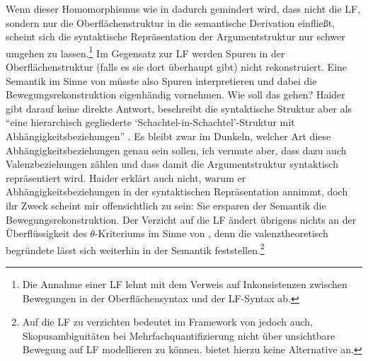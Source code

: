 {Wenn dieser Homomorphismus wie in \cite{Haider:04} dadurch gemindert wird, dass nicht die LF, sondern nur die Oberflächenstruktur in die semantische Derivation einflie\ss t, scheint sich die syntaktische Repräsentation der Argumentstruktur nur schwer umgehen zu lassen.\footnote{Die Annahme einer LF lehnt \cite{Haider:04} mit dem Verweis auf Inkonsistenzen zwischen Bewegungen in der Oberflächensyntax und der LF-Syntax ab.} Im Gegensatz zur LF werden Spuren in der Oberflächenstruktur (falls es sie dort überhaupt gibt) nicht rekonstruiert. Eine Semantik im Sinne von \cite{Heim:Kratzer:98} müsste also Spuren interpretieren und dabei die Bewegungsrekonstruktion eigenhändig vornehmen. Wie soll das gehen? Haider gibt darauf keine direkte Antwort, beschreibt die syntaktische Struktur aber als "`eine hierarchisch gegliederte `Schachtel-in-Schachtel'-Struktur mit Abhängigkeitsbeziehungen"' \citep[73]{Haider:04}. Es bleibt zwar im Dunkeln, welcher Art diese Abhängigkeitsbeziehungen genau sein sollen, ich vermute aber, dass dazu auch Valenzbeziehungen zählen und dass damit die Argumentstruktur syntaktisch repräsentiert wird. Haider erklärt auch nicht, warum er Abhängigkeitsbeziehungen in der syntaktischen Repräsentation annimmt, doch ihr Zweck scheint 	mir offensichtlich zu sein: Sie ersparen der Semantik die Bewegungsrekonstruktion. Der Verzicht auf die LF ändert übrigens nichts an der Überflüssigkeit des $\theta$-Kriteriums im Sinne von \cite{Heim:Kratzer:98}, denn die valenztheoretisch begründete  lässt sich weiterhin in der Semantik feststellen.\footnote{Auf die LF zu verzichten bedeutet im Framework von \cite{Heim:Kratzer:98} jedoch auch, Skopusambiguitäten bei Mehrfachquantifizierung nicht über unsichtbare Bewegung auf LF modellieren zu können. \cite{Haider:04} bietet hierzu keine Alternative an.}  

}
